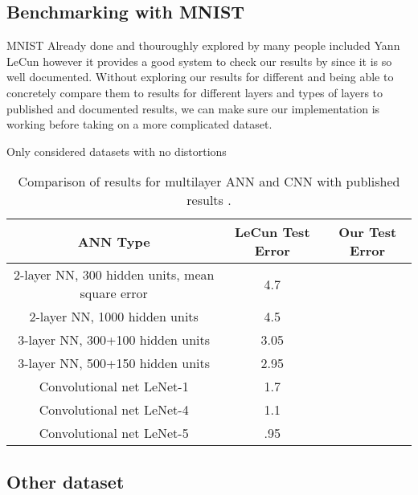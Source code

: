 \documentclass[12pt, twocolumn]{article}
\begin{document}
\subsection{Benchmarking with MNIST}
MNIST  \cite{MNIST} 
Already done and thouroughly explored by many people included Yann LeCun \cite{LeCun1998} however it provides a good system to check our results by since it is so well documented. Without exploring our results for different and being able to concretely compare them to results for different layers and types of layers to published and documented results, we can make sure our implementation is working before taking on a more complicated dataset. 


Only considered datasets with no distortions

\begin{table*}[h!]
\begin{tabular} { |c | c | c | }
    \hline
    ANN Type & LeCun Test Error  &  Our Test Error  \\ \hline
    2-layer NN, 300 hidden units, mean square error & 4.7 & \\ \hline
    2-layer NN, 1000 hidden units & 4.5 & \\ \hline
    3-layer NN, 300+100 hidden units & 3.05 & \\ \hline
    3-layer NN, 500+150 hidden units & 2.95 & \\ \hline
    Convolutional net LeNet-1 & 1.7 & \\ \hline 
    Convolutional net LeNet-4 & 1.1& \\ \hline 
    Convolutional net LeNet-5 &  .95 & \\ \hline
\end{tabular}
\label{table: MNISTLeCun}
\caption{Comparison of results for multilayer ANN and CNN with published results \cite{LeCun1998}.}
\end{table*}

 
\subsection{Other dataset}



 
\end{document}
